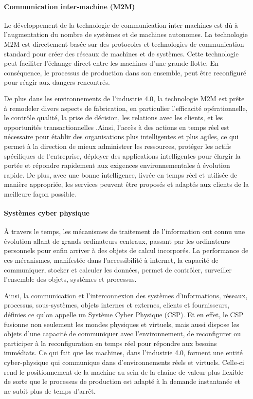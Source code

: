 \newpage
\paragraph{Communication inter-machine (M2M)}
Le développement de la technologie de communication inter machines est dû à l'augmentation du nombre de systèmes et de machines autonomes. La technologie M2M est directement basée sur des protocoles et technologies de communication standard pour créer des réseaux de machines et de systèmes. Cette technologie peut faciliter l'échange direct entre les machines d'une grande flotte. En conséquence, le processus de production dans son ensemble, peut être reconfiguré pour réagir aux dangers rencontrés.

De plus dans les environnements de l'industrie 4.0, la technologie M2M est prête à remodeler divers aspects de fabrication, en particulier l'efficacité opérationnelle, le contrôle qualité, la prise de décision, les relations avec les clients, et les opportunités transactionnelles .Ainsi, l'accès à des actions en temps réel est nécessaire pour établir des organisations plus intelligentes et plus agiles, ce qui permet à la direction de mieux administrer les ressources, protéger les actifs spécifiques de l'entreprise, déployer des applications intelligentes pour élargir la portée et répondre rapidement aux exigences environnementales à évolution rapide. De plus, avec une bonne intelligence, livrée en temps réel et utilisée de manière appropriée, les services peuvent être proposés et adaptés aux clients de la meilleure façon possible.

\paragraph{Systèmes cyber physique}
À travers le temps, les mécanismes de traitement de l'information ont connu une évolution allant de grands ordinateurs centraux, passant par les ordinateurs personnels pour enfin arriver à des objets de calcul incorporés. La performance de ces mécanismes, manifestée dans l'accessibilité à internet, la capacité de communiquer, stocker et calculer les données, permet de contrôler, surveiller l'ensemble des objets, systèmes et processus. 

Ainsi, la communication et l'interconnexion des systèmes d'informations, réseaux, processus, sous-systèmes, objets internes et externes, clients et fournisseurs, définies ce qu'on appelle un Système Cyber Physique (CSP). Et en effet, le CSP fusionne non seulement les mondes physiques et virtuels, mais aussi dispose les objets d'une capacité de communiquer avec l'environnement, de reconfigurer ou participer à la reconfiguration en temps réel pour répondre aux besoins immédiats. Ce qui fait que les machines, dans l'industrie 4.0, forment une entité cyber-physique qui communique dans d'environnements réels et virtuels. Celle-ci rend le positionnement de la machine au sein de la chaîne de valeur plus flexible de sorte que le processus de production est adapté à la demande instantanée et ne subit plus de temps d'arrêt.

